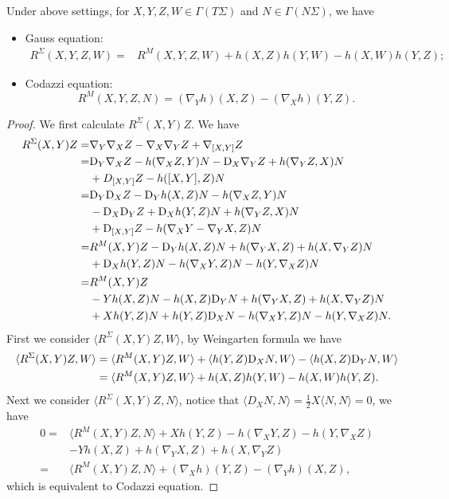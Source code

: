 \begin{thm}
    Under above settings, for $X,Y,Z,W\in\Gamma(T\Sigma)$ and $N\in\Gamma(N\Sigma)$, we have
    \begin{itemize}
        \item Gauss equation:
        \begin{align*}
            R^\Sigma(X,Y,Z,W)=&R^M(X,Y,Z,W)+h(X,Z)h(Y,W)-h(X,W)h(Y,Z);
        \end{align*}
        \item Codazzi equation:
        \[R^M(X,Y,Z,N)=(\nabla_Yh)(X,Z)-(\nabla_Xh)(Y,Z).\]
    \end{itemize}
\end{thm}
\begin{proof}
    We first calculate $R^\Sigma(X,Y)Z$.
    We have
    \begin{align*}
        R^\Sigma(X,Y)Z=&\nabla_Y\nabla_XZ-\nabla_X\nabla_YZ+\nabla_{[X,Y]}Z\\
        =&\mathrm{D}_Y\nabla_XZ-h(\nabla_XZ,Y)N-\mathrm{D}_X\nabla_YZ+h(\nabla_YZ,X)N\\
        &+D_{[X,Y]}Z-h([X,Y],Z)N\\
        =&\mathrm{D}_Y\mathrm{D}_XZ-\mathrm{D}_Yh(X,Z)N-h(\nabla_XZ,Y)N\\
        &-\mathrm{D}_X\mathrm{D}_YZ+\mathrm{D}_Xh(Y,Z)N+h(\nabla_YZ,X)N\\
        &+\mathrm{D}_{[X,Y]}Z-h(\nabla_XY-\nabla_YX,Z)N\\
        =&R^M(X,Y)Z-\mathrm{D}_Yh(X,Z)N+h(\nabla_YX,Z)+h(X,\nabla_YZ)N\\
        &+\mathrm{D}_Xh(Y,Z)N-h(\nabla_XY,Z)N-h(Y,\nabla_XZ)N\\
        =&R^M(X,Y)Z\\
        &-Yh(X,Z)N-h(X,Z)\mathrm{D}_YN+h(\nabla_YX,Z)+h(X,\nabla_YZ)N\\
        &+Xh(Y,Z)N+h(Y,Z)\mathrm{D}_XN-h(\nabla_XY,Z)N-h(Y,\nabla_XZ)N.
    \end{align*}
    First we consider $\langle R^\Sigma(X,Y)Z,W\rangle$, by Weingarten formula we have
    \begin{align*}
        \langle R^\Sigma(X,Y)Z,W\rangle&=\langle R^M(X,Y)Z,W\rangle+\langle h(Y,Z)\mathrm{D}_XN,W\rangle-\langle h(X,Z)\mathrm{D}_YN,W\rangle\\
        &=\langle R^M(X,Y)Z,W\rangle+h(X,Z)h(Y,W)-h(X,W)h(Y,Z).
    \end{align*}
    Next we consider $\langle R^\Sigma(X,Y)Z,N\rangle$, notice that $\langle D_XN,N\rangle=\frac{1}{2}X\langle N,N\rangle=0$, we have
    \begin{align*}
        0=&\langle R^M(X,Y)Z,N\rangle+Xh(Y,Z)-h(\nabla_XY,Z)-h(Y,\nabla_XZ)\\
        &-Yh(X,Z)+h(\nabla_YX,Z)+h(X,\nabla_YZ)\\
        =&\langle R^M(X,Y)Z,N\rangle+(\nabla_Xh)(Y,Z)-(\nabla_Yh)(X,Z),
    \end{align*}
    which is equivalent to Codazzi equation.
\end{proof}
